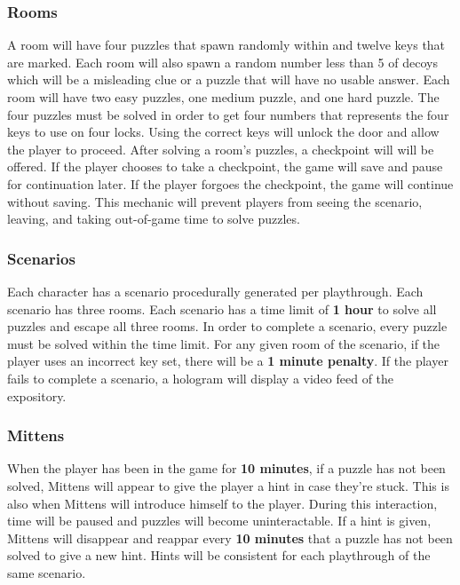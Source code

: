\documentclass[12pt]{article}
\begin{document}
\subsubsection{Rooms}
\label{sec:orgc131786}
A room will have four puzzles that spawn randomly within and twelve keys that are marked. Each room will also spawn a random number less than 5 of decoys which will be a misleading clue or a puzzle that will have no usable answer. Each room will have two easy puzzles, one medium puzzle, and one hard puzzle. The four puzzles must be solved in order to get four numbers that represents the four keys to use on four locks. Using the correct keys will unlock the door and allow the player to proceed. After solving a room's puzzles, a checkpoint will will be offered. If the player chooses to take a checkpoint, the game will save and pause for continuation later. If the player forgoes the checkpoint, the game will continue without saving. This mechanic will prevent players from seeing the scenario, leaving, and taking out-of-game time to solve puzzles.

\subsubsection{Scenarios}
\label{sec:orgab7df90}
Each character has a scenario procedurally generated per playthrough. Each scenario has three rooms. Each scenario has a time limit of \textbf{1 hour} to solve all puzzles and escape all three rooms. In order to complete a scenario, every puzzle must be solved within the time limit. For any given room of the scenario, if the player uses an incorrect key set, there will be a \textbf{1 minute penalty}. If the player fails to complete a scenario, a hologram will display a video feed of the expository. 

\subsubsection{Mittens}
\label{sec:orgb49db88}
When the player has been in the game for \textbf{10 minutes}, if a puzzle has not been solved, Mittens will appear to give the player a hint in case they're stuck. This is also when Mittens will introduce himself to the player. During this interaction, time will be paused and puzzles will become uninteractable. If a hint is given, Mittens will disappear and reappar every \textbf{10 minutes} that a puzzle has not been solved to give a new hint. Hints will be consistent for each playthrough of the same scenario.
\end{document}
